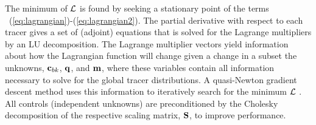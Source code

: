 \documentclass[agums]{aguplus}  %
\begin{document}
The minimum of ${\cal L}$ is found by seeking a stationary point of
the terms ~(\ref{eq:lagrangian})-(\ref{eq:lagrangian2}). The partial
derivative with respect to each tracer gives a set of (adjoint)
equations that is solved for the Lagrange multipliers by an LU
decomposition.  The Lagrange multiplier vectors yield information
about how the Lagrangian function will change given a change in a
subset the unknowns, ${\bf c}_{bk}$, ${\bf q}$, and ${\bf m}$, where
these variables contain all information necessary to solve for the
global tracer distributions.  A quasi-Newton gradient descent method
uses this information to iteratively search for the minimum ${\cal L}$
\citep{Nocedal-1980:Updating,Gilbert-Lemarechal-1989:some}.  All
controls (independent unknowns) are preconditioned by the Cholesky
decomposition of the respective scaling matrix, ${\bf S}$, to improve
performance.



\end{document}
